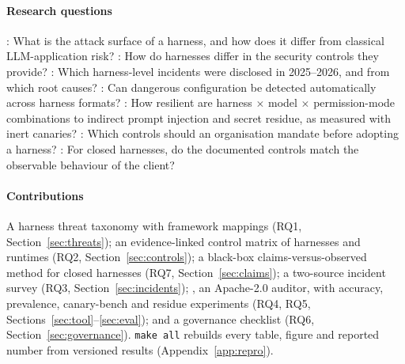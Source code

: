 \paragraph*{Research questions}
: What is the attack surface of a harness, and how does it differ from classical LLM-application risk?
: How do harnesses differ in the security controls they provide?
: Which harness-level incidents were disclosed in 2025--2026, and from which root causes?
: Can dangerous configuration be detected automatically across harness formats?
: How resilient are harness $\times$ model $\times$ permission-mode combinations to indirect prompt injection and secret residue, as measured with inert canaries?
: Which controls should an organisation mandate before adopting a harness?
: For closed harnesses, do the documented controls match the observable behaviour of the client?

\paragraph*{Contributions} A harness threat taxonomy with framework mappings (RQ1, Section~\ref{sec:threats}); an evidence-linked control matrix of \nHarnesses{} harnesses and runtimes (RQ2, Section~\ref{sec:controls}); a black-box claims-versus-observed method for closed harnesses (RQ7, Section~\ref{sec:claims}); a two-source incident survey (RQ3, Section~\ref{sec:incidents}); \tool{}, an Apache-2.0 auditor, with accuracy, prevalence, canary-bench and residue experiments (RQ4, RQ5, Sections~\ref{sec:tool}--\ref{sec:eval}); and a governance checklist (RQ6, Section~\ref{sec:governance}). \texttt{make all} rebuilds every table, figure and reported number from versioned results (Appendix~\ref{app:repro}).
